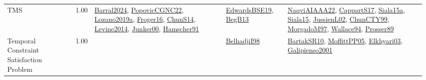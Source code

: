 {\begin{longtable}{p{3cm}r>{\raggedright\arraybackslash}p{6cm}>{\raggedright\arraybackslash}p{6cm}>{\raggedright\arraybackslash}p{8cm}}
\index{TMS}\index{Classification!TMS}TMS &  1.00 & \hyperref[detail:Barral2024]{Barral2024}, \hyperref[detail:PopovicCGNC22]{PopovicCGNC22}, \hyperref[detail:Lozano2019a]{Lozano2019a}, \hyperref[detail:Froger16]{Froger16}, \hyperref[detail:ChunS14]{ChunS14}, \hyperref[detail:Levine2014]{Levine2014}, \hyperref[detail:Junker00]{Junker00}, \hyperref[detail:Hamscher91]{Hamscher91} & \hyperref[detail:EdwardsBSE19]{EdwardsBSE19}, \hyperref[detail:BegB13]{BegB13} & \hyperref[detail:NaqviAIAAA22]{NaqviAIAAA22}, \hyperref[detail:CappartS17]{CappartS17}, \hyperref[detail:Siala15a]{Siala15a}, \hyperref[detail:Siala15]{Siala15}, \hyperref[detail:JussienL02]{JussienL02}, \hyperref[detail:ChunCTY99]{ChunCTY99}, \hyperref[detail:MorgadoM97]{MorgadoM97}, \hyperref[detail:Wallace94]{Wallace94}, \hyperref[detail:Prosser89]{Prosser89}\\
\index{Temporal Constraint Satisfaction Problem}\index{Classification!Temporal Constraint Satisfaction Problem}Temporal Constraint Satisfaction Problem &  1.00 &  & \hyperref[detail:BelhadjiI98]{BelhadjiI98} & \hyperref[detail:BartakSR10]{BartakSR10}, \hyperref[detail:MoffittPP05]{MoffittPP05}, \hyperref[detail:Elkhyari03]{Elkhyari03}, \hyperref[detail:Galipienso2001]{Galipienso2001}\\

\end{longtable}}
